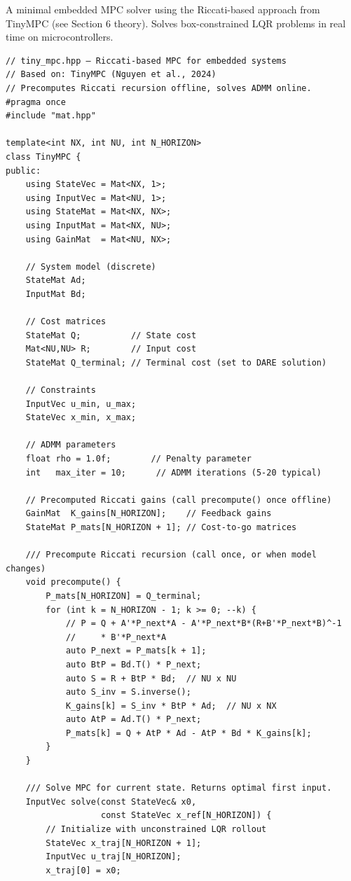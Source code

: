 A minimal embedded MPC solver using the Riccati-based approach from TinyMPC (see Section 6 theory). Solves box-constrained LQR problems in real time on microcontrollers.

\begin{verbatim}
// tiny_mpc.hpp — Riccati-based MPC for embedded systems
// Based on: TinyMPC (Nguyen et al., 2024)
// Precomputes Riccati recursion offline, solves ADMM online.
#pragma once
#include "mat.hpp"

template<int NX, int NU, int N_HORIZON>
class TinyMPC {
public:
    using StateVec = Mat<NX, 1>;
    using InputVec = Mat<NU, 1>;
    using StateMat = Mat<NX, NX>;
    using InputMat = Mat<NX, NU>;
    using GainMat  = Mat<NU, NX>;

    // System model (discrete)
    StateMat Ad;
    InputMat Bd;

    // Cost matrices
    StateMat Q;          // State cost
    Mat<NU,NU> R;        // Input cost
    StateMat Q_terminal; // Terminal cost (set to DARE solution)

    // Constraints
    InputVec u_min, u_max;
    StateVec x_min, x_max;

    // ADMM parameters
    float rho = 1.0f;        // Penalty parameter
    int   max_iter = 10;      // ADMM iterations (5-20 typical)

    // Precomputed Riccati gains (call precompute() once offline)
    GainMat  K_gains[N_HORIZON];    // Feedback gains
    StateMat P_mats[N_HORIZON + 1]; // Cost-to-go matrices

    /// Precompute Riccati recursion (call once, or when model changes)
    void precompute() {
        P_mats[N_HORIZON] = Q_terminal;
        for (int k = N_HORIZON - 1; k >= 0; --k) {
            // P = Q + A'*P_next*A - A'*P_next*B*(R+B'*P_next*B)^-1
            //     * B'*P_next*A
            auto P_next = P_mats[k + 1];
            auto BtP = Bd.T() * P_next;
            auto S = R + BtP * Bd;  // NU x NU
            auto S_inv = S.inverse();
            K_gains[k] = S_inv * BtP * Ad;  // NU x NX
            auto AtP = Ad.T() * P_next;
            P_mats[k] = Q + AtP * Ad - AtP * Bd * K_gains[k];
        }
    }

    /// Solve MPC for current state. Returns optimal first input.
    InputVec solve(const StateVec& x0,
                   const StateVec x_ref[N_HORIZON]) {
        // Initialize with unconstrained LQR rollout
        StateVec x_traj[N_HORIZON + 1];
        InputVec u_traj[N_HORIZON];
        x_traj[0] = x0;


\end{verbatim}

